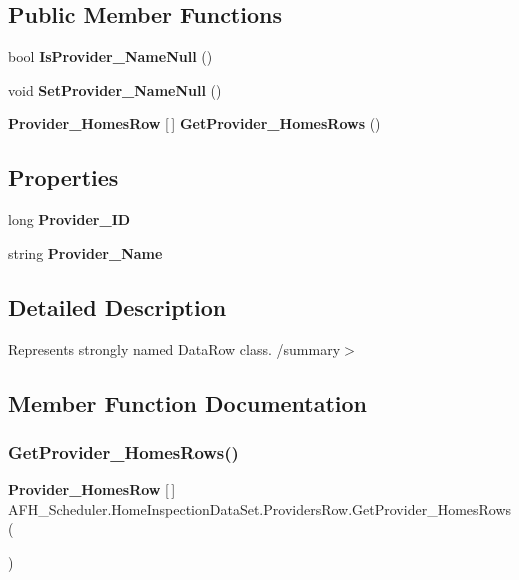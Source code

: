 \subsection*{Public Member Functions}
\begin{DoxyCompactItemize}
\item 
bool \textbf{ Is\+Provider\+\_\+\+Name\+Null} ()
\item 
void \textbf{ Set\+Provider\+\_\+\+Name\+Null} ()
\item 
\textbf{ Provider\+\_\+\+Homes\+Row} [$\,$] \textbf{ Get\+Provider\+\_\+\+Homes\+Rows} ()
\end{DoxyCompactItemize}
\subsection*{Properties}
\begin{DoxyCompactItemize}
\item 
long \textbf{ Provider\+\_\+\+ID}\hspace{0.3cm}{\ttfamily  [get, set]}
\item 
string \textbf{ Provider\+\_\+\+Name}\hspace{0.3cm}{\ttfamily  [get, set]}
\end{DoxyCompactItemize}


\subsection{Detailed Description}
Represents strongly named Data\+Row class. /summary$>$ 

\subsection{Member Function Documentation}
\mbox{\label{class_a_f_h___scheduler_1_1_home_inspection_data_set_1_1_providers_row_ae91059f7ca9c285cffe66a9dc91dceb3}} 
\subsubsection{GetProvider\_HomesRows()}
{\footnotesize\ttfamily \textbf{ Provider\+\_\+\+Homes\+Row} [$\,$] A\+F\+H\+\_\+\+Scheduler.\+Home\+Inspection\+Data\+Set.\+Providers\+Row.\+Get\+Provider\+\_\+\+Homes\+Rows (\begin{DoxyParamCaption}{ }\end{DoxyParamCaption})}

